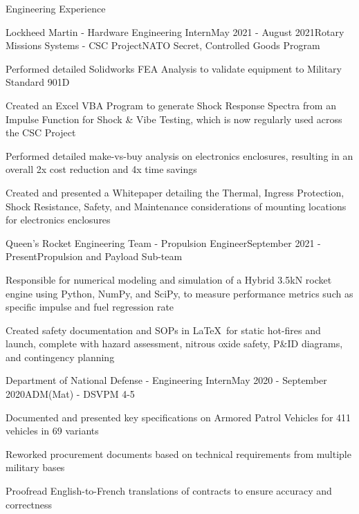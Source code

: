 \documentclass{resume} %
\begin{document}
\vspace{1em}
\begin{rSection}{Engineering Experience}

\begin{rSubsection}{Lockheed Martin - Hardware Engineering Intern}{May 2021 - August 2021}{Rotary Missions Systems - CSC Project}{NATO Secret, Controlled Goods Program}

\item Performed detailed Solidworks FEA Analysis to validate equipment to Military Standard 901D
\item Created an Excel VBA Program to generate Shock Response Spectra from an Impulse Function for Shock \& Vibe Testing, which is now regularly used across the CSC Project
\item Performed detailed make-vs-buy analysis on electronics enclosures, resulting in an overall 2x cost reduction and 4x time savings
\item Created and presented a Whitepaper detailing the Thermal, Ingress Protection, Shock Resistance, Safety, and Maintenance considerations of mounting locations for electronics enclosures

\end{rSubsection}

\begin{rSubsection}{Queen's Rocket Engineering Team - Propulsion Engineer}{September 2021 - Present}{Propulsion and Payload Sub-team}{}

\item Responsible for numerical modeling and simulation of a Hybrid 3.5kN rocket engine using Python, NumPy, and SciPy, to measure performance metrics such as specific impulse and fuel regression rate
\item Created safety documentation and SOPs in \LaTeX\ for static hot-fires and launch, complete with hazard assessment, nitrous oxide safety, P\&ID diagrams, and contingency planning

\end{rSubsection}

\begin{rSubsection}{Department of National Defense - Engineering Intern}{May 2020 - September 2020}{ADM(Mat) - DSVPM 4-5}{}

\item Documented and presented key specifications on Armored Patrol Vehicles for 411 vehicles in 69 variants
\item Reworked procurement documents based on technical requirements from multiple military bases
\item Proofread English-to-French translations of contracts to ensure accuracy and correctness

\end{rSubsection}


\end{rSection}
\end{document}
